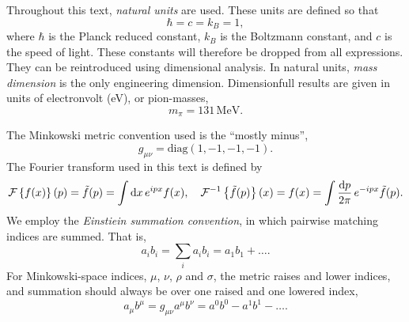 Throughout this text, \emph{natural units} are used.
These units are defined so that
\begin{equation}
    \hbar = c = k_B = 1,
\end{equation}
where $\hbar$ is the Planck reduced constant, $k_B$ is the Boltzmann constant, and $c$ is the speed of light.
These constants will therefore be dropped from all expressions.
They can be reintroduced using dimensional analysis.
In natural units, \emph{mass dimension} is the only engineering dimension.
Dimensionfull results are given in units of electronvolt (eV), or pion-masses, 
\begin{equation}
    m_\pi = 131 \, \text{MeV}.
\end{equation}

The Minkowski metric convention used is the ``mostly minus'',
\begin{equation}
    g_{\mu \nu} = \mathrm{diag}(1, -1, -1, -1).
\end{equation}
The Fourier transform used in this text is defined by
\begin{align*}
    \mathcal{F}\left\{ f(x) \right\}(p) = \tilde f(p) = \int \dd x\, e^{i p x}f(x), \quad 
    \mathcal{F}^{-1}\left\{ \tilde f(p) \right\}(x) = f(x) = \int \frac{\dd p}{2 \pi}\, e^{- i p x} \tilde f(p).
\end{align*}
We employ the \emph{Einstiein summation convention}, in which pairwise matching indices are summed.
That is,
\begin{equation}
    a_i b_i = \sum_i a_i b_i = a_1 b_1 + \dots.
\end{equation}
For Minkowski-space indices, $\mu$, $\nu$, $\rho$ and $\sigma$, the metric raises and lower indices, and summation should always be over one raised and one lowered index,
\begin{equation}
    a_\mu b^\mu = g_{\mu\nu} a^\mu b^\nu 
    = a^0 b^0 - a^1 b^1 - \dots.
\end{equation}
